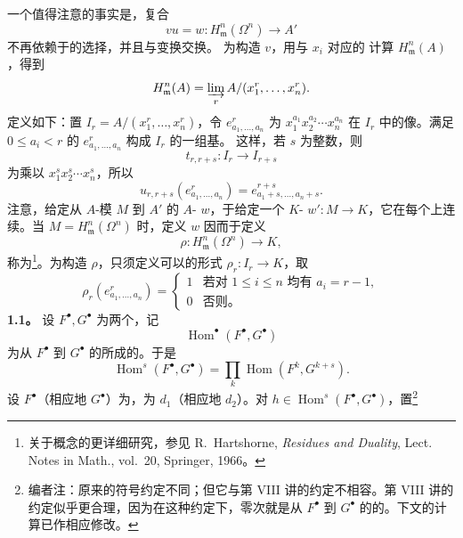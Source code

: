 一个值得注意的事实是，复合
\[vu=w:H^n_{\mathfrak m}(\Omega^n)\longrightarrow A'\]
不再依赖于的选择，并且与变换交换。
为构造 $v$，用与 $x_i$ 对应的 计算 $H^n_{\mathfrak m}(A)$，得到
\[H^n_{\mathfrak m}(A)=\varinjlim_r A/(x_1^r,\ldots,x_n^r).\]
定义如下：置 $I_r=A/(x_1^r,\ldots,x_n^r)$，令 $e^r_{a_1,\ldots,a_n}$ 为 $x_1^{a_1}x_2^{a_2}\cdots x_n^{a_n}$ 在 $I_r$ 中的像。满足 $0\le a_i<r$ 的 $e^r_{a_1,\ldots,a_n}$ 构成 $I_r$ 的一组基。
这样，若 $s$ 为整数，则
\[t_{r,r+s}:I_r\longrightarrow I_{r+s}\]
为乘以 $x_1^sx_2^s\cdots x_n^s$，所以
\[u_{r,r+s}(e^r_{a_1,\ldots,a_n})=e^{r+s}_{a_1+s,\ldots,a_n+s}.\]
注意，给定从 $A$-模 $M$ 到 $A'$ 的 $A$- $w$，于给定一个 $K$- $w':M\to K$，它在每个上连续。当 $M=H^n_{\mathfrak m}(\Omega^n)$ 时，定义 $w$ 因而于定义
\[\rho:H^n_{\mathfrak m}(\Omega^n)\longrightarrow K,\]
称为\begingroup\renewcommand{\thefootnote}{*}\footnote[1]{关于概念的更详细研究，参见 R.~Hartshorne, \emph{Residues and Duality}, Lect. Notes in Math., vol.~20, Springer, 1966。}\endgroup{}。为构造 $\rho$，只须定义可以的形式 $\rho_r:I_r\to K$，取
\[\rho_r(e^r_{a_1,\ldots,a_n})=\begin{cases}1&\text{若对 }1\le i\le n\text{ 均有 }a_i=r-1,\\0&\text{否则。}\end{cases}\]
\textbf{1.1。} 设 $F^{\bullet},G^{\bullet}$ 为两个，记
\[\operatorname{Hom}^{\bullet}(F^{\bullet},G^{\bullet})\tag{1}\]
为从 $F^{\bullet}$ 到 $G^{\bullet}$ 的所成的。于是
\[\operatorname{Hom}^s(F^{\bullet},G^{\bullet})=\prod_k\operatorname{Hom}(F^k,G^{k+s}).\tag{2}\]
设 $F^{\bullet}$（相应地 $G^{\bullet}$）为，为 $d_1$（相应地 $d_2$）。对 $h\in\operatorname{Hom}^s(F^{\bullet},G^{\bullet})$，置\footnote[1]{编者注：原来的符号约定不同；但它与第 VIII 讲的约定不相容。第 VIII 讲的约定似乎更合理，因为在这种约定下，零次就是从 $F^{\bullet}$ 到 $G^{\bullet}$ 的的。下文的计算已作相应修改。}
